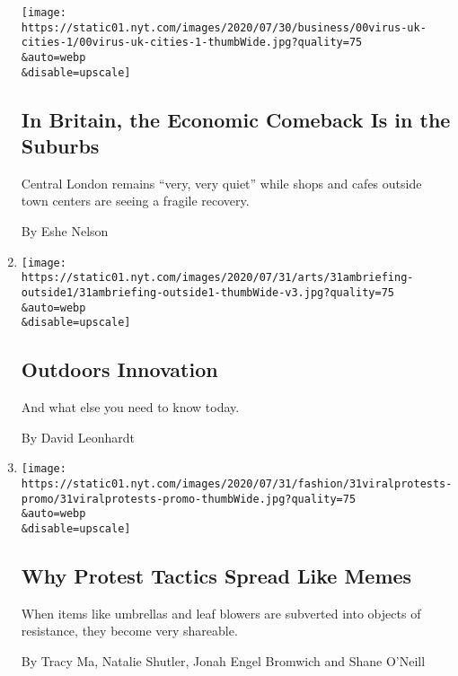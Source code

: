 \begin{enumerate}
  \texttt{[image: https://static01.nyt.com/images/2020/07/30/business/00virus-uk-cities-1/00virus-uk-cities-1-thumbWide.jpg?quality=75\\\&auto=webp\\\&disable=upscale]}

  \hypertarget{in-britain-the-economic-comeback-is-in-the-suburbs}{%
  \subsection{In Britain, the Economic Comeback Is in the
  Suburbs}\label{in-britain-the-economic-comeback-is-in-the-suburbs}}

  Central London remains ``very, very quiet'' while shops and cafes
  outside town centers are seeing a fragile recovery.

  By Eshe Nelson
\item
  \href{/2020/07/31/briefing/nba-economy-herman-cain-your-friday-briefing.html}{}

  \texttt{[image: https://static01.nyt.com/images/2020/07/31/arts/31ambriefing-outside1/31ambriefing-outside1-thumbWide-v3.jpg?quality=75\\\&auto=webp\\\&disable=upscale]}

  \hypertarget{outdoors-innovation}{%
  \subsection{Outdoors Innovation}\label{outdoors-innovation}}

  And what else you need to know today.

  By David Leonhardt
\item
  \href{/2020/07/31/style/viral-protest-videos.html}{}

  \texttt{[image: https://static01.nyt.com/images/2020/07/31/fashion/31viralprotests-promo/31viralprotests-promo-thumbWide.jpg?quality=75\\\&auto=webp\\\&disable=upscale]}

  \hypertarget{why-protest-tactics-spread-like-memes}{%
  \subsection{Why Protest Tactics Spread Like
  Memes}\label{why-protest-tactics-spread-like-memes}}

  When items like umbrellas and leaf blowers are subverted into objects
  of resistance, they become very shareable.

  By Tracy Ma, Natalie Shutler, Jonah Engel Bromwich and Shane O'Neill
\end{enumerate}

